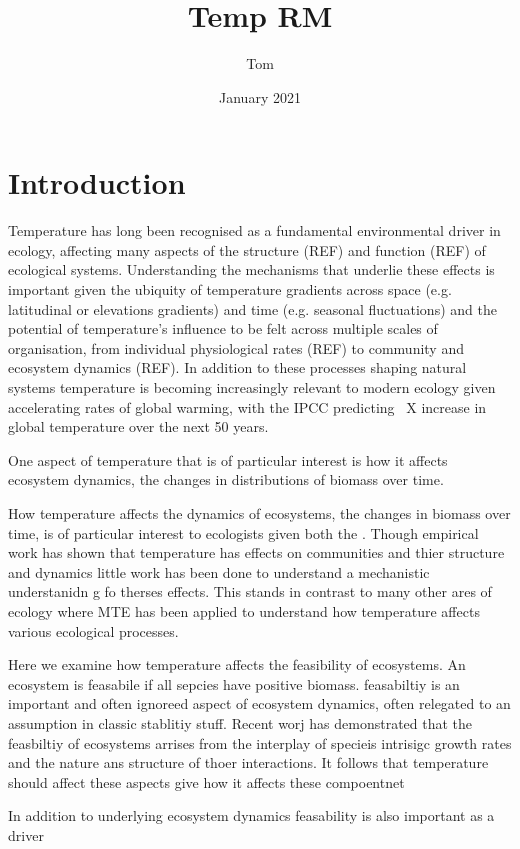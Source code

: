 \documentclass{article}
\title{Temp RM}
\author{Tom}
\date{January 2021}
\begin{document}
\maketitle

\section{Introduction}

Temperature has long been recognised as a fundamental environmental driver in ecology, affecting many aspects of the structure (REF) and function (REF) of ecological systems. Understanding the mechanisms that underlie these effects is important given the ubiquity of temperature gradients across space (e.g. latitudinal or elevations gradients) and time (e.g. seasonal fluctuations) and the potential of temperature's influence to be felt across multiple scales of organisation, from individual physiological rates (REF) to community and ecosystem dynamics (REF). In addition to these processes shaping natural systems temperature is becoming increasingly relevant to modern ecology given accelerating rates of global warming, with the IPCC predicting ~X increase in global temperature over the next 50 years. 


One aspect of temperature that is of particular interest is how it affects ecosystem dynamics, the changes in distributions of biomass over time. 

How temperature affects the dynamics of ecosystems, the changes in biomass over time, is of particular interest to ecologists given both the  . Though empirical work has shown that temperature has effects on communities and thier structure and dynamics little work has been done to understand a mechanistic understanidn g fo therses effects. This stands in contrast to many other ares of ecology where MTE has been applied to understand how temperature affects various ecological processes. 

Here we examine how temperature affects the feasibility of ecosystems. An ecosystem is feasabile if all sepcies have positive biomass. feasabiltiy is an important and often ignoreed aspect of ecosystem dynamics, often relegated to an assumption in classic stablitiy stuff. Recent worj has demonstrated that the feasbiltiy of ecosystems arrises from the interplay of specieis intrisigc growth rates and the nature ans structure of thoer interactions. It follows that temperature should affect these aspects give how it affects these compoentnet

In addition to underlying ecosystem dynamics feasability is also important as a driver 
\end{document}
